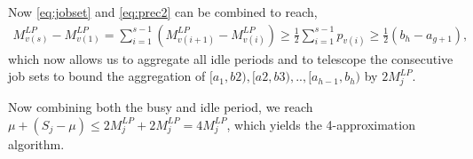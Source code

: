 Now \eqref{eq:jobset} and \eqref{eq:prec2} can be combined to reach,
\begin{align}
M^{LP}_{v(s)} - M^{LP}_{v(1)} = \sum_{i=1}^{s-1} \left(M^{LP}_{v(i+1)} - M^{LP}_{v(i)}\right) \geq \frac{1}{2}\sum_{i=1}^{s-1} p_{v(i)} \geq \frac{1}{2} (b_h-a_{g+1}),
\end{align}
which now allows us to aggregate all idle periods and to telescope the consecutive job sets to bound the aggregation of $[a_1, b2), [a2, b3), .., [a_{h-1}, b_h)$ by $2M_j^{LP}$. 

Now combining both the busy and idle period, we reach $\mu + (S_j - \mu) \leq 2M_j^{LP} + 2M_j^{LP} = 4M_j^{LP}$, which yields the 4-approximation algorithm.
